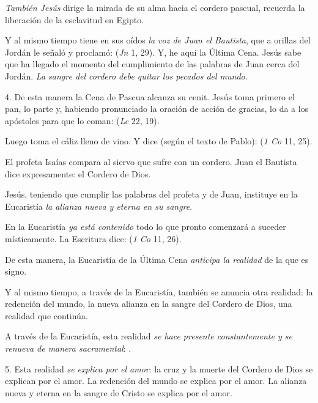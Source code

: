 \begin{body}
\textit{También Jesús} dirige la mirada de su alma hacia el cordero pascual, recuerda la liberación de la esclavitud en Egipto. 

Y al mismo tiempo tiene en sus oídos \textit{la voz de Juan el Bautista}, que a orillas del Jordán le señaló y proclamó:  (\textit{Jn} 1, 29). Y, he aquí la Última Cena. Jesús sabe que ha llegado el momento del cumplimiento de las palabras de Juan cerca del Jordán. \textit{La sangre del cordero debe quitar los pecados del mundo}. 

4. De esta manera la Cena de Pascua alcanza su cenit. Jesús toma primero el pan, lo parte y, habiendo pronunciado la oración de acción de gracias, lo da a los apóstoles para que lo coman:  (\textit{Lc} 22, 19). 

Luego toma el cáliz lleno de vino. Y dice (según el texto de Pablo):  (\textit{1 Co} 11, 25). 

El profeta Isaías compara al siervo que sufre con un cordero. Juan el Bautista dice expresamente: el Cordero de Dios. 

Jesús, teniendo que cumplir las palabras del profeta y de Juan, instituye en la Eucaristía \textit{la alianza nueva y eterna en su sangre}. 

En la Eucaristía \textit{ya está contenido} todo lo que pronto comenzará a suceder místicamente. La Escritura dice:  (\textit{1 Co} 11, 26). 

De esta manera, la Eucaristía de la Última Cena \textit{anticipa la realidad} de la que es signo. 

Y al mismo tiempo, a través de la Eucaristía, también se anuncia otra realidad: la redención del mundo, la nueva alianza en la sangre del Cordero de Dios, una realidad que continúa. 

A través de la Eucaristía, esta realidad \textit{se hace presente constantemente y se renueva de manera sacramental}: . 

5. Esta realidad \textit{se explica por el amor}: la cruz y la muerte del Cordero de Dios se explican por el amor. La redención del mundo se explica por el amor. La alianza nueva y eterna en la sangre de Cristo se explica por el amor. 


\end{body}
